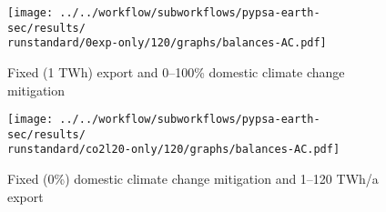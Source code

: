 
\begin{figure*}[h!]
    \centering
    \begin{subfigure}[b]{0.49\linewidth}
        \centering
        \texttt{[image: ../../workflow/subworkflows/pypsa-earth-sec/results/\\runstandard/0exp-only/120/graphs/balances-AC.pdf]}
        \caption{Fixed (1 TWh) export and 0--100\% domestic climate change mitigation}
        \label{fig:balances-ac-0exp-120}
    \end{subfigure}
    \hfill
    \begin{subfigure}[b]{0.49\linewidth}
        \centering
        \texttt{[image: ../../workflow/subworkflows/pypsa-earth-sec/results/\\runstandard/co2l20-only/120/graphs/balances-AC.pdf]}
        \caption{Fixed (0\%) domestic climate change mitigation and 1--120 TWh/a export}
        \label{fig:balances-ac-co2l20-120}
    \end{subfigure}
    \hfill
    \caption{Electricity supply and demand at fixed export levels and increasing domestic climate change mitigation (\ref{fig:balances-ac-0exp-120}) and vice versa (\ref{fig:balances-ac-co2l20-120}). Increasing domestic climate change mitigation first phases out carbon-intensive coal generation in favor of CCGT, at medium to high domestic climate change mitigation the electricity system is fully renewable supported by flexibility through Vehicle-to-Grid (V2G) and sector coupling. Increasing electricity demands include Battery Electric Vehicles (BEV) and hydrogen generation for other sectors.
    At increasing hydrogen exports the additional electricity required for hydrogen electrolysis is covered by onshore wind and solar PV, as imposed by the temporal hydrogen regulation. 
    }
    \label{fig:balances-ac}
\end{figure*}


